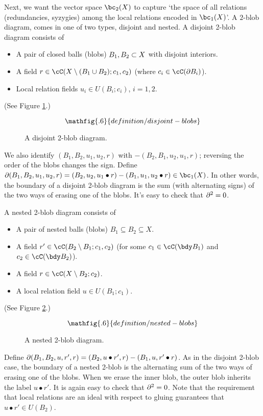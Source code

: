Next, we want the vector space $\bc_2(X)$ to capture `the space of all relations 
(redundancies, syzygies) among the 
local relations encoded in $\bc_1(X)$'.
A $2$-blob diagram, comes in one of two types, disjoint and nested.
A disjoint 2-blob diagram consists of
\begin{itemize}
\item A pair of closed balls (blobs) $B_1, B_2 \subset X$ with disjoint interiors.
\item A field $r \in \cC(X \setmin (B_1 \cup B_2); c_1, c_2)$
(where $c_i \in \cC(\bd B_i)$).
\item Local relation fields $u_i \in U(B_i; c_i)$, $i=1,2$.
\end{itemize}
(See Figure \ref{blob2ddiagram}.)
\begin{figure}[t]\begin{equation*}
\mathfig{.6}{definition/disjoint-blobs}
\end{equation*}\caption{A disjoint 2-blob diagram.}\label{blob2ddiagram}\end{figure}
We also identify $(B_1, B_2, u_1, u_2, r)$ with $-(B_2, B_1, u_2, u_1, r)$;
reversing the order of the blobs changes the sign.
Define $\bd(B_1, B_2, u_1, u_2, r) = 
(B_2, u_2, u_1\bullet r) - (B_1, u_1, u_2\bullet r) \in \bc_1(X)$.
In other words, the boundary of a disjoint 2-blob diagram
is the sum (with alternating signs)
of the two ways of erasing one of the blobs.
It's easy to check that $\partial^2 = 0$.

A nested 2-blob diagram consists of
\begin{itemize}
\item A pair of nested balls (blobs) $B_1 \subseteq B_2 \subseteq X$.
\item A field $r' \in \cC(B_2 \setminus B_1; c_1, c_2)$ 
(for some $c_1 \in \cC(\bdy B_1)$ and $c_2 \in \cC(\bdy B_2)$).
\item A field $r \in \cC(X \setminus B_2; c_2)$.
\item A local relation field $u \in U(B_1; c_1)$.
\end{itemize}
(See Figure \ref{blob2ndiagram}.)
\begin{figure}[t]\begin{equation*}
\mathfig{.6}{definition/nested-blobs}
\end{equation*}\caption{A nested 2-blob diagram.}\label{blob2ndiagram}\end{figure}
Define $\partial(B_1, B_2, u, r', r) = (B_2, u\bullet r', r) - (B_1, u, r' \bullet r)$.
As in the disjoint 2-blob case, the boundary of a nested 2-blob is the alternating
sum of the two ways of erasing one of the blobs.
When  we erase the inner blob, the outer blob inherits the label $u\bullet r'$.
It is again easy to check that $\partial^2 = 0$. Note that the requirement that
local relations are an ideal with respect to gluing guarantees that $u\bullet r' \in U(B_2)$.

